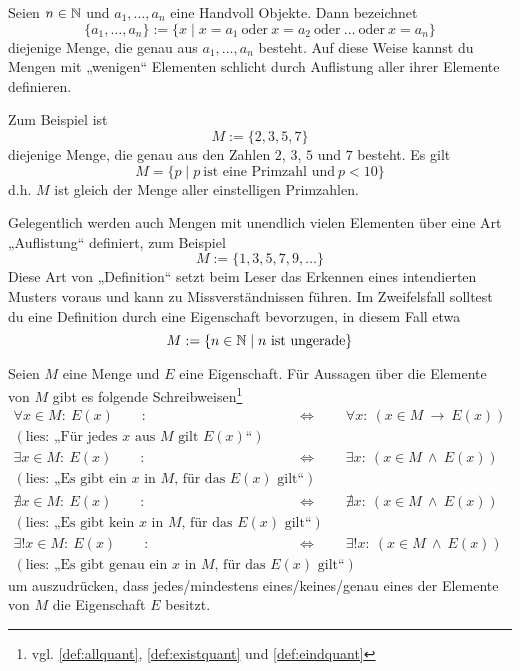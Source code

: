 \begin{nota} \label{auflistung}
    Seien $n\in \mathbb N$ und $a_1,\dots , a_n$ eine Handvoll Objekte. Dann bezeichnet
        \[ \{a_1,\dots , a_n\} := \{ x\mid x=a_1\ \text{oder}\ x=a_2\ \text{oder}\ \ldots\ \text{oder}\ x=a_n \} \]
    diejenige Menge, die genau aus $a_1,\dots , a_n$ besteht. Auf diese Weise kannst du Mengen mit „wenigen“ Elementen schlicht durch Auflistung aller ihrer Elemente definieren.
\end{nota}


\begin{bsp}
    Zum Beispiel ist
        \[ M:=\{2,3,5,7\} \]
    diejenige Menge, die genau aus den Zahlen $2$, $3$, $5$ und $7$ besteht. Es gilt
        \[ M = \{p\mid p\ \text{ist eine Primzahl und}\ p <10 \} \]
    d.h. $M$ ist gleich der Menge aller einstelligen Primzahlen.
\end{bsp}


\begin{bem}
    Gelegentlich werden auch Mengen mit unendlich vielen Elementen über eine Art „Auflistung“ definiert, zum Beispiel
        \[ M := \{1, 3, 5, 7, 9,\ldots \} \]
    Diese Art von „Definition“ setzt beim Leser das Erkennen eines intendierten Musters voraus und kann zu Missverständnissen führen. Im Zweifelsfall solltest du eine Definition durch eine Eigenschaft bevorzugen, in diesem Fall etwa
        \[ M := \{n \in \mathbb N \mid n\ \text{ist ungerade} \} \]
\end{bem}


\begin{nota}[*] \label{beschraenktquant}
    Seien $M$ eine Menge und $E$ eine Eigenschaft. Für Aussagen über die Elemente von $M$ gibt es folgende Schreibweisen\footnote{vgl. \cref{def:allquant}, \cref{def:existquant} und \cref{def:eindquant}}
    \begin{align*}
        \forall x\in M:\ E(x) \qquad :& \Leftrightarrow\qquad \forall x:\ (x\in M\ \to\ E(x))  \\
        (\text{lies: „Für jedes $x$ aus $M$ gilt $E(x)$“}) & \\[0.5em]
        \exists x\in M:\ E(x) \qquad :& \Leftrightarrow\qquad \exists x:\ (x\in M\ \land\ E(x))  \\
        (\text{lies: „Es gibt ein $x$ in $M$, für das $E(x)$ gilt“}) & \\[0.5em]
        \nexists x\in M:\ E(x) \qquad :& \Leftrightarrow\qquad \nexists x:\ (x\in M\ \land\ E(x))  \\
        (\text{lies: „Es gibt kein $x$ in $M$, für das $E(x)$ gilt“}) & \\[0.5em]
        \exists ! x\in M :\ E(x) \qquad :& \Leftrightarrow\qquad \exists ! x:\ (x\in M\ \land\ E(x)) \\ (\text{lies: „Es gibt genau ein $x$ in $M$, für das $E(x)$ gilt“})
    \end{align*}
    um auszudrücken, dass jedes/mindestens eines/keines/genau eines der Elemente von $M$ die Eigenschaft $E$ besitzt.
\end{nota}


